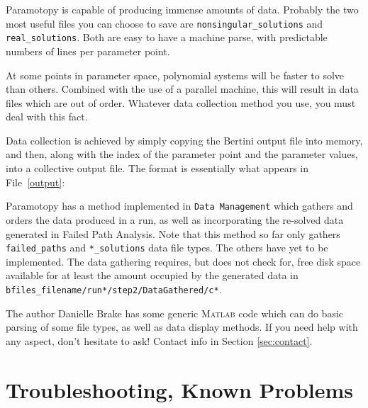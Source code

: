 Paramotopy is capable of producing immense amounts of data.  Probably the two most useful files you can choose to save are \texttt{nonsingular\_solutions} and \texttt{real\_solutions}.  Both are easy to have a machine parse, with predictable numbers of lines per parameter point.

At some points in parameter space,  polynomial systems  will be faster to solve than others.  Combined with the use of a parallel machine, this will result in data files which are out of order.  Whatever data collection method you use, you must deal with this fact.

Data collection is achieved by simply copying the Bertini output file into memory, and then, along with the index of the parameter point and the parameter values, into a collective output file.  The format is essentially what appears in File~\ref{output}:


Paramotopy has a method implemented in \texttt{Data Management} which gathers and orders the data produced in a run, as well as incorporating the re-solved data generated in Failed Path Analysis.  Note that this method so far only gathers \texttt{failed\_paths} and \texttt{*\_solutions} data file types.  The others have yet to be implemented.  The data gathering requires, but does not check for, free disk space available for at least the amount occupied by the generated data in \texttt{bfiles\_filename/run*/step2/DataGathered/c*}.


The author Danielle Brake has some generic \textsc{Matlab} code which can do basic parsing of some file types, as well as data display methods.   If you need help with any aspect, don't hesitate to ask! Contact info in Section \ref{sec:contact}.







\clearpage
\section{Troubleshooting, Known Problems}
\label{sec:troubleshooting}

